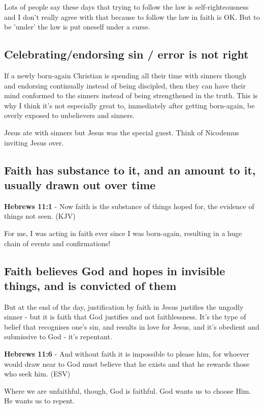\documentclass[11pt]{article}
\begin{document}
Lots of people say these days that trying to follow the law is self-righteousness and I don't really agree with that because to follow the law in faith is OK.
But to be 'under' the law is put oneself under a curse.

\subsection{Celebrating/endorsing sin / error is not right}
\label{sec:org082f400}

If a newly born-again Christian is spending all their time with sinners though and endorsing continually instead of being discipled, then they can
have their mind conformed to the sinners instead of being strengthened in the truth. This is why I think it's not especially great to, immediately after getting born-again,
be overly exposed to unbelievers and sinners.

Jesus ate with sinners but Jesus was the special guest. Think of Nicodemus inviting Jesus over.

\subsection{Faith has substance to it, and an amount to it, usually drawn out over time}
\label{sec:org3e19f55}
\textbf{Hebrews 11:1} - Now faith is the substance of things hoped for, the evidence of things not seen. (KJV)

For me, I was acting in faith ever since I was born-again, resulting in a huge chain of events and confirmations!

\subsection{Faith believes God and hopes in invisible things, and is convicted of them}
\label{sec:orgc220f6c}

But at the end of the day, justification by faith in Jesus justifies the ungodly sinner - but it is faith that God justifies and not faithlessness. It's the type of belief that recognises one's sin, and results in love for Jesus, and it's obedient and submissive to God - it's repentant.

\textbf{Hebrews 11:6} - And without faith it is impossible to please him, for whoever would draw near to God must believe that he exists and that he rewards those who seek him. (ESV)

Where we are unfaithful, though, God is faithful. God wants us to choose Him. He wants us to repent.
\end{document}
